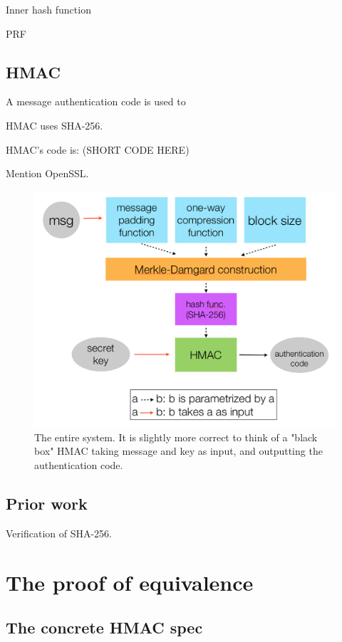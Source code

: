 \documentclass[twocolumn,showpacs,%
  nofootinbib,aps,superscriptaddress,%
  eqsecnum,prd,notitlepage,showkeys,10pt]{revtex4-1}
\begin{document}
Inner hash function

PRF

\subsection{HMAC}

A message authentication code is used to

HMAC uses SHA-256. 

HMAC's code is: (SHORT CODE HERE)

Mention OpenSSL.

\begin{figure}[h!]
	\centering
	\includegraphics[scale=0.4]{Cryptosystem}
	\caption{The entire system. It is slightly more correct to think of a "black box" HMAC taking message and key as input, and outputting the authentication code.}
\end{figure}

\subsection{Prior work}

Verification of SHA-256.

\section{The proof of equivalence}

\subsection{The concrete HMAC spec}
\end{document}
